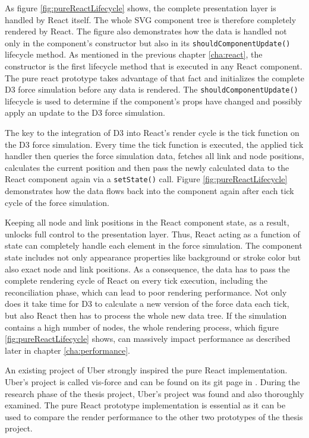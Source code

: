 As figure \ref{fig:pureReactLifecycle} shows, the complete presentation layer is handled by React itself. The whole SVG component tree is therefore completely rendered by React. The figure also demonstrates how the data is handled not only in the component's constructor but also in its \texttt{shouldComponentUpdate()} lifecycle method. As mentioned in the previous chapter \ref{cha:react}, the constructor is the first lifecycle method that is executed in any React component. The pure react prototype takes advantage of that fact and initializes the complete D3 force simulation before any data is rendered. The \texttt{shouldComponentUpdate()} lifecycle is used to determine if the component's props have changed and possibly apply an update to the D3 force simulation.

The key to the integration of D3 into React's render cycle is the tick function on the D3 force simulation. Every time the tick function is executed, the applied tick handler then queries the force simulation data, fetches all link and node positions, calculates the current position and then pass the newly calculated data to the React component again via a \texttt{setState()} call. Figure \ref{fig:pureReactLifecycle} demonstrates how the data flows back into the component again after each tick cycle of the force simulation.

Keeping all node and link positions in the React component state, as a result, unlocks full control to the presentation layer. Thus, React acting as a function of state can completely handle each element in the force simulation. The component state includes not only appearance properties like background or stroke color but also exact node and link positions. As a consequence, the data has to pass the complete rendering cycle of React on every tick execution, including the reconciliation phase, which can lead to poor rendering performance. Not only does it take time for D3 to calculate a new version of the force data each tick, but also React then has to process the whole new data tree. If the simulation contains a high number of nodes, the whole rendering process, which figure \ref{fig:pureReactLifecycle} shows, can massively impact performance as described later in chapter \ref{cha:performance}.

An existing project of Uber strongly inspired the pure React implementation. Uber's project is called vis-force and can be found on its git page in \cite{UberVisForce}. During the research phase of the thesis project, Uber's project was found and also thoroughly examined. The pure React prototype implementation is essential as it can be used to compare the render performance to the other two prototypes of the thesis project.

